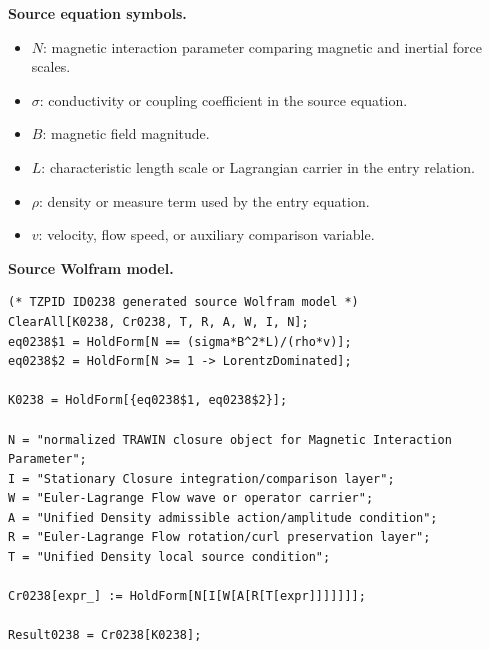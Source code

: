 \begin{minipage}[t]{0.49\linewidth}
\begingroup
\small
\raggedright
\textbf{Source equation symbols.}\par
\begin{itemize}[leftmargin=1.35em,itemsep=1pt,topsep=1pt,parsep=0pt]
    \item $N$: magnetic interaction parameter comparing magnetic and inertial force scales.
    \item $\sigma$: conductivity or coupling coefficient in the source equation.
    \item $B$: magnetic field magnitude.
    \item $L$: characteristic length scale or Lagrangian carrier in the entry relation.
    \item $\rho$: density or measure term used by the entry equation.
    \item $v$: velocity, flow speed, or auxiliary comparison variable.
\end{itemize}
\endgroup
\end{minipage}\hfill
\begin{minipage}[t]{0.47\linewidth}
\begingroup
\scriptsize
\raggedright
\textbf{Source Wolfram model.}\par
\begin{Verbatim}[fontsize=\tiny,breaklines=true,breakanywhere=true]
(* TZPID ID0238 generated source Wolfram model *)
ClearAll[K0238, Cr0238, T, R, A, W, I, N];
eq0238$1 = HoldForm[N == (sigma*B^2*L)/(rho*v)];
eq0238$2 = HoldForm[N >= 1 -> LorentzDominated];

K0238 = HoldForm[{eq0238$1, eq0238$2}];

N = "normalized TRAWIN closure object for Magnetic Interaction Parameter";
I = "Stationary Closure integration/comparison layer";
W = "Euler-Lagrange Flow wave or operator carrier";
A = "Unified Density admissible action/amplitude condition";
R = "Euler-Lagrange Flow rotation/curl preservation layer";
T = "Unified Density local source condition";

Cr0238[expr_] := HoldForm[N[I[W[A[R[T[expr]]]]]]];

Result0238 = Cr0238[K0238];
\end{Verbatim}
\endgroup
\end{minipage}

